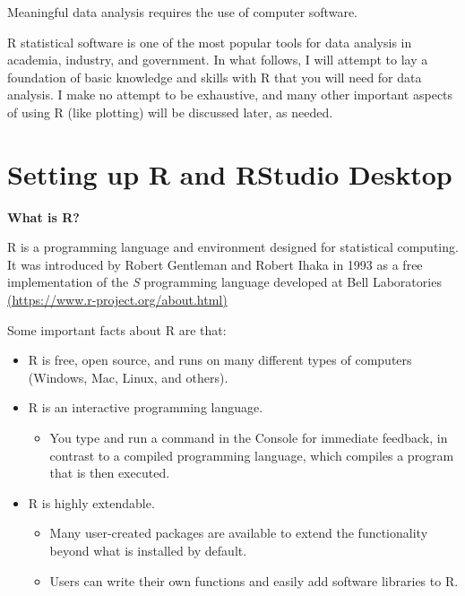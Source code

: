 \documentclass[
]{book}
\providecommand{\tightlist}{%
  \setlength{\itemsep}{0pt}\setlength{\parskip}{0pt}}
\theoremstyle{definition}
\theoremstyle{definition}
\theoremstyle{definition}
\theoremstyle{definition}
\theoremstyle{remark}
\begin{document}
Meaningful data analysis requires the use of computer software.

R statistical software is one of the most popular tools for data analysis in academia, industry, and government. In what follows, I will attempt to lay a foundation of basic knowledge and skills with R that you will need for data analysis. I make no attempt to be exhaustive, and many other important aspects of using R (like plotting) will be discussed later, as needed.

\hypertarget{setting-up-r-and-rstudio-desktop}{%
\section{Setting up R and RStudio Desktop}\label{setting-up-r-and-rstudio-desktop}}

\textbf{What is R?}

R is a programming language and environment designed for statistical computing. It was introduced by Robert Gentleman and Robert Ihaka in 1993 as a free implementation of the \emph{S} programming language developed at Bell Laboratories \href{https://www.r-project.org/about.html}{(https://www.r-project.org/about.html)}

Some important facts about R are that:

\begin{itemize}
\tightlist
\item
  R is free, open source, and runs on many different types of computers (Windows, Mac, Linux, and others).
\item
  R is an interactive programming language.

  \begin{itemize}
  \tightlist
  \item
    You type and run a command in the Console for immediate feedback, in contrast to a compiled programming language, which compiles a program that is then executed.
  \end{itemize}
\item
  R is highly extendable.

  \begin{itemize}
  \tightlist
  \item
    Many user-created packages are available to extend the functionality beyond what is installed by default.
  \item
    Users can write their own functions and easily add software libraries to R.
  \end{itemize}
\end{itemize}
\end{document}
